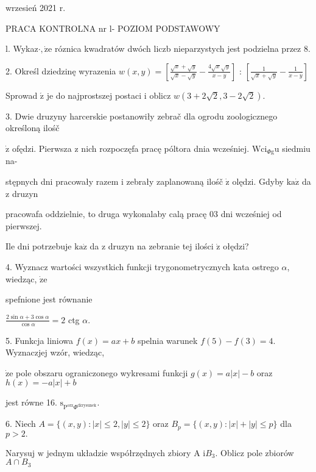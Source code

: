 \documentclass[a4paper,12pt]{article}
\begin{document}
wrzesień 2021 r.

PRACA KONTROLNA nr l- POZIOM PODSTAWOWY

l. Wykaz$\cdot, \dot{\mathrm{z}}\mathrm{e}$ róznica kwadratów dwóch liczb nieparzystych jest podzielna przez 8.

2. Określ dziedzinę wyrazenia $w(x,y)= [\displaystyle \frac{\sqrt{x}+\sqrt{y}}{\sqrt{x}-\sqrt{y}}-\frac{4\sqrt{x}\sqrt{y}}{x-y}]$ : $[\displaystyle \frac{1}{\sqrt{x}+\sqrt{y}}-\frac{1}{x-y}]$

Sprowad $\acute{\mathrm{z}}$ je do najprostszej postaci $\mathrm{i}$ oblicz $w(3+2\sqrt{2},3-2\sqrt{2}).$

3. Dwie druzyny harcerskie postanowiły zebrač dla ogrodu zoologicznego określoną ilośč

$\dot{\mathrm{z}}$ ofędzi. Pierwsza $\mathrm{z}$ nich rozpoczęfa pracę póltora dnia wcześniej. $\mathrm{W}\mathrm{c}\mathrm{i}_{\Phi \mathrm{g}}\mathrm{u}$ siedmiu na-

stępnych dni pracowały razem $\mathrm{i}$ zebrały zaplanowaną ilośč $\dot{\mathrm{z}}$ olędzi. Gdyby $\mathrm{k}\mathrm{a}\dot{\mathrm{z}}$ da $\mathrm{z}$ druzyn

pracowafa oddzielnie, to druga wykonalaby calą pracę $03$ dni wcześniej od pierwszej.

Ile dni potrzebuje $\mathrm{k}\mathrm{a}\dot{\mathrm{z}}$ da $\mathrm{z}$ druzyn na zebranie tej ilości $\dot{\mathrm{z}}$ ołędzi?

4. Wyznacz wartości wszystkich funkcji trygonometrycznych kata ostrego $\alpha$, wiedząc, $\dot{\mathrm{z}}\mathrm{e}$

spefnione jest równanie

$\displaystyle \frac{2\sin\alpha+3\cos\alpha}{\cos\alpha}=2$ ctg $\alpha.$

5. Funkcja liniowa $f(x)=ax+b$ spelnia warunek $f(5)-f(3)=4$. Wyznaczjej wzór, wiedząc,

$\dot{\mathrm{z}}\mathrm{e}$ pole obszaru ograniczonego wykresami funkcji $g(x)=a|x|-b$ oraz $h(x)=-a|x|+b$

jest równe 16. $\mathrm{s}_{\mathrm{P}^{\mathrm{o}\mathrm{r}\mathrm{z}}\Phi^{\mathrm{d}\acute{\mathrm{z}}\mathrm{r}\mathrm{y}\mathrm{s}\mathrm{u}\mathrm{n}\mathrm{e}\mathrm{k}}}.$

6. Niech $A= \{(x,y):|x|\leq 2,|y|\leq 2\}$ oraz $B_{p}= \{(x,y):|x|+|y|\leq p\}$ dla $p> 2.$

Narysuj $\mathrm{w}$ jednym układzie współrzędnych zbiory A $\mathrm{i}B_{3}$. Oblicz pole zbiorów $A\cap B_{3}$
\end{document}
